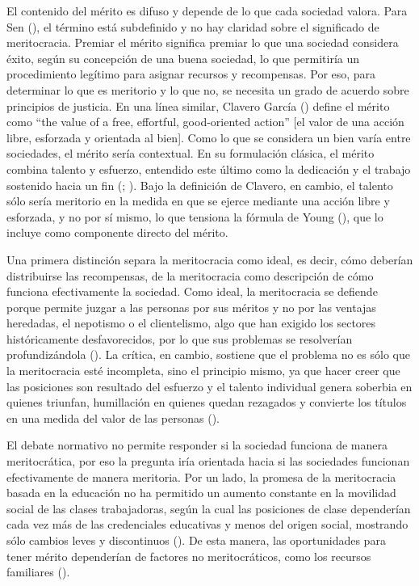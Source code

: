 \documentclass[
  spanish,
  a4paper,
  oneside]{scrbook}
\begin{document}
El contenido del mérito es difuso y depende de lo que cada sociedad
valora. Para Sen (), el
término está subdefinido y no hay claridad sobre el significado de
meritocracia. Premiar el mérito significa premiar lo que una sociedad
considera éxito, según su concepción de una buena sociedad, lo que
permitiría un procedimiento legítimo para asignar recursos y
recompensas. Por eso, para determinar lo que es meritorio y lo que no,
se necesita un grado de acuerdo sobre principios de justicia. En una
línea similar, Clavero García () define el mérito como ``the value of a free, effortful,
good-oriented action'' {[}el valor de una acción libre, esforzada y
orientada al bien{]}. Como lo que se considera un bien varía entre
sociedades, el mérito sería contextual. En su formulación clásica, el
mérito combina talento y esfuerzo, entendido este último como la
dedicación y el trabajo sostenido hacia un fin
(;
). Bajo la
definición de Clavero, en cambio, el talento sólo sería meritorio en la
medida en que se ejerce mediante una acción libre y esforzada, y no por
sí mismo, lo que tensiona la fórmula de Young
(), que lo incluye como componente
directo del mérito.

Una primera distinción separa la meritocracia como ideal, es decir, cómo
deberían distribuirse las recompensas, de la meritocracia como
descripción de cómo funciona efectivamente la sociedad. Como ideal, la
meritocracia se defiende porque permite juzgar a las personas por sus
méritos y no por las ventajas heredadas, el nepotismo o el clientelismo,
algo que han exigido los sectores históricamente desfavorecidos, por lo
que sus problemas se resolverían profundizándola
(). La
crítica, en cambio, sostiene que el problema no es sólo que la
meritocracia esté incompleta, sino el principio mismo, ya que hacer
creer que las posiciones son resultado del esfuerzo y el talento
individual genera soberbia en quienes triunfan, humillación en quienes
quedan rezagados y convierte los títulos en una medida del valor de las
personas ().

El debate normativo no permite responder si la sociedad funciona de
manera meritocrática, por eso la pregunta iría orientada hacia si las
sociedades funcionan efectivamente de manera meritoria. Por un lado, la
promesa de la meritocracia basada en la educación no ha permitido un
aumento constante en la movilidad social de las clases trabajadoras,
según la cual las posiciones de clase dependerían cada vez más de las
credenciales educativas y menos del origen social, mostrando sólo
cambios leves y discontinuos
(). De
esta manera, las oportunidades para tener mérito dependerían de factores
no meritocráticos, como los recursos familiares
().
\end{document}
